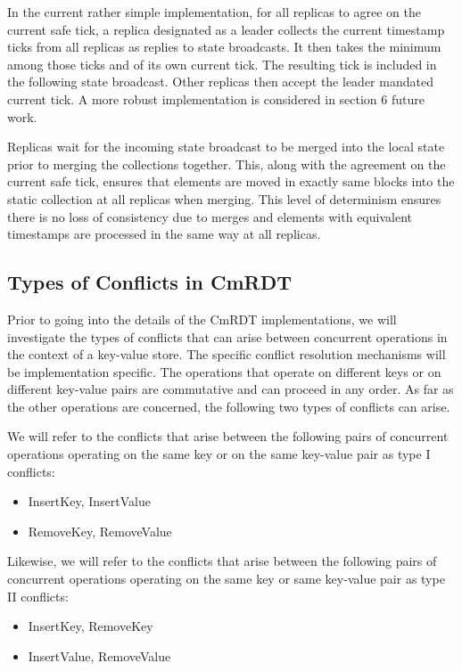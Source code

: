 \documentclass[sigconf,nonacm,11pt]{acmart}
\begin{document}
In the current rather simple implementation, for all replicas to agree on the current safe tick, a replica designated as a leader collects the current timestamp ticks from all replicas as replies to state broadcasts. It then takes the minimum among those ticks and of its own current tick. The resulting tick is included in the following state broadcast. Other replicas then accept the leader mandated current tick. A more robust implementation is considered in section 6 future work.

Replicas wait for the incoming state broadcast to be merged into the local state prior to merging the collections together. This, along with the agreement on the current safe tick, ensures that elements are moved in exactly same blocks into the static collection at all replicas when merging. This level of determinism ensures there is no loss of consistency due to merges and elements with equivalent timestamps are processed in the same way at all replicas.

\subsection{Types of Conflicts in CmRDT}
Prior to going into the details of the CmRDT implementations, we will investigate the types of conflicts that can arise between concurrent operations in the context of a key-value store. The specific conflict resolution mechanisms will be implementation specific. The operations that operate on different keys or on different key-value pairs are commutative and can proceed in any order. As far as the other operations are concerned, the following two types of conflicts can arise.

We will refer to the conflicts that arise between the following pairs of concurrent operations operating on the same key or on the same key-value pair as type I conflicts:
\begin{itemize}
 \item InsertKey, InsertValue
 \item RemoveKey, RemoveValue
\end{itemize}

Likewise, we will refer to the conflicts that arise between the following pairs of concurrent operations operating on the same key or same key-value pair as type II conflicts:
\begin{itemize}
 \item InsertKey, RemoveKey
 \item InsertValue, RemoveValue
\end{itemize}
\end{document}
